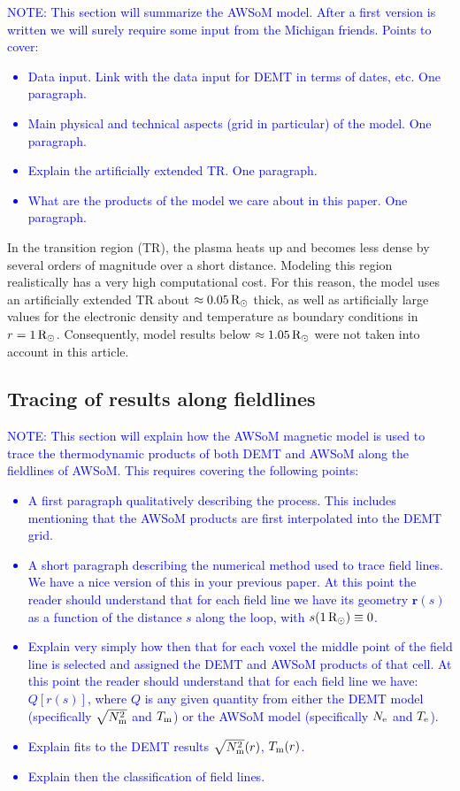 \documentclass[namedreferences]{solarphysics}
\newcommand{\mrsun}{{\rm R_\odot}}
\newcommand{\Te}{T_{\rm e}}
\newcommand{\Tm}{T_{\rm m}}
\newcommand{\Ne}{N_{\rm e}}
\newcommand{\Nsqm}{N^2_{{\rm m}}}
\newcommand{\sqravgN}{\sqrt{\Nsqm}}
\def\notebyalbert#1{\textcolor{blue}{NOTE: #1}}
\begin{document}
\begin{article}
\noindent\notebyalbert{This section will summarize the AWSoM model. After a first version is written we will surely require some input from the Michigan friends. Points to cover:
\begin{itemize}
  \item Data input. Link with the data input for DEMT in terms of dates, etc. One paragraph.
  \item Main physical and technical aspects (grid in particular) of the model.  One paragraph. 
  \item Explain the artificially extended TR. One paragraph.
  \item What are the products of the model we care about in this paper. One paragraph.
\end{itemize}
}

In the transition region {(TR)}, the plasma heats up and becomes less dense {by} several orders of magnitude {over} a short distance. Modeling this region {realistically has a very high computational cost}. For this {reason,} the model uses {an artificially} extended {TR about $\approx 0.05\,\mrsun$ thick, as well as artificially large values for the electronic density and temperature as boundary conditions in $r=1\,\mrsun$.} Consequently, model results below {$\approx 1.05\,\mrsun$} were not taken into account in this article.

\subsection{Tracing of results along fieldlines}\label{trace} 

\noindent\notebyalbert{This section will explain how the AWSoM magnetic model is used to trace the thermodynamic products of both DEMT and AWSoM along the fieldlines of AWSoM. This requires covering the following points:
\begin{itemize}
  \item A first paragraph qualitatively describing the process. This includes mentioning that the AWSoM products are first interpolated into the DEMT grid.
  \item A short paragraph describing the numerical method used to trace field lines. We have a nice version of this in your previous paper.  At this point the reader should understand that for each field line we have its geometry $\mathbf{r}(s)$ as a function of the distance $s$ along the loop, with $s(1\,\mrsun)\equiv 0$. 
  \item Explain very simply how then that for each voxel the middle point of the field line is selected and assigned the DEMT and AWSoM products of that cell. At this point the reader should understand that for each field line we have: $Q[r(s)]$, where $Q$ is any given quantity from either the DEMT model (specifically $\sqravgN$ and $\Tm$) or the AWSoM model (specifically $\Ne$ and $\Te$).
  \item Explain fits to the DEMT results  $\sqravgN(r)$, $\Tm(r)$.
  \item Explain then the classification of field lines.
\end{itemize}
} 


\end{article}
\end{document}

